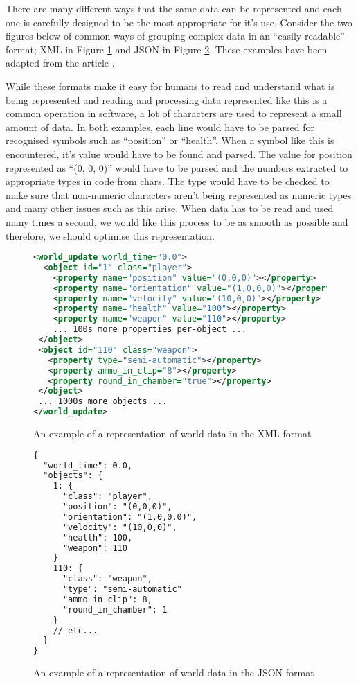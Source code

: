 There are many different ways that the same data can be represented and each one is carefully designed to be the most appropriate for it's use. Consider the two figures below of common ways of grouping complex data in an ``easily readable'' format; XML in Figure \ref{fig:xml-example} and JSON in Figure \ref{fig:json-example}. These examples have been adapted from the article .

While these formats make it easy for humans to read and understand what is being represented and reading and processing data represented like this is a common operation in software, a lot of characters are used to represent a small amount of data. In both examples, each line would have to be parsed for recognised symbols such as ``position'' or ``health''. When a symbol like this is encountered, it's value would have to be found and parsed. The value for position represented as ``(0, 0, 0)'' would have to be parsed and the numbers extracted to appropriate types in code from chars. The type would have to be checked to make sure that non-numeric characters aren't being represented as numeric types and many other issues such as this arise. When data has to be read and used many times a second, we would like this process to be as smooth as possible and therefore, we should optimise this representation.

\newpage
\begin{figure}[!ht]
\begin{lstlisting}[language=xml]
<world_update world_time="0.0">
  <object id="1" class="player">
    <property name="position" value="(0,0,0)"></property>
    <property name="orientation" value="(1,0,0,0)"></property>
    <property name="velocity" value="(10,0,0)"></property>
    <property name="health" value="100"></property>
    <property name="weapon" value="110"></property>
    ... 100s more properties per-object ...
 </object>
 <object id="110" class="weapon">
   <property type="semi-automatic"></property>
   <property ammo_in_clip="8"></property>
   <property round_in_chamber="true"></property>
 </object>
 ... 1000s more objects ...
</world_update>
\end{lstlisting}

\caption{An example of a representation of world data in the XML format}
\label{fig:xml-example}
\end{figure}

\begin{figure}[!ht]
\begin{lstlisting}[language=xml]
{
  "world_time": 0.0,
  "objects": {
    1: {
      "class": "player",
      "position": "(0,0,0)",
      "orientation": "(1,0,0,0)",
      "velocity": "(10,0,0)",
      "health": 100,
      "weapon": 110
    }
    110: {
      "class": "weapon",
      "type": "semi-automatic"
      "ammo_in_clip": 8,
      "round_in_chamber": 1
    }
    // etc...
  }
}
\end{lstlisting}

\caption{An example of a representation of world data in the JSON format}
\label{fig:json-example}
\end{figure}
\newpage

